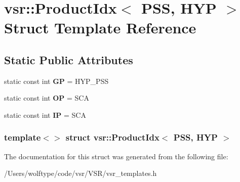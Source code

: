 \hypertarget{structvsr_1_1_product_idx_3_01_p_s_s_00_01_h_y_p_01_4}{\section{vsr\-:\-:Product\-Idx$<$ P\-S\-S, H\-Y\-P $>$ Struct Template Reference}
\label{structvsr_1_1_product_idx_3_01_p_s_s_00_01_h_y_p_01_4}
}
\subsection*{Static Public Attributes}
\begin{DoxyCompactItemize}
\item 
\hypertarget{structvsr_1_1_product_idx_3_01_p_s_s_00_01_h_y_p_01_4_ab7af9bced0e2bc59de0a6fbbaef07d05}{static const int {\bfseries G\-P} = H\-Y\-P\-\_\-\-P\-S\-S}\label{structvsr_1_1_product_idx_3_01_p_s_s_00_01_h_y_p_01_4_ab7af9bced0e2bc59de0a6fbbaef07d05}

\item 
\hypertarget{structvsr_1_1_product_idx_3_01_p_s_s_00_01_h_y_p_01_4_a5fa4f921578a53e3b93872497f43f5ae}{static const int {\bfseries O\-P} = S\-C\-A}\label{structvsr_1_1_product_idx_3_01_p_s_s_00_01_h_y_p_01_4_a5fa4f921578a53e3b93872497f43f5ae}

\item 
\hypertarget{structvsr_1_1_product_idx_3_01_p_s_s_00_01_h_y_p_01_4_a4153d4781b0a4cb52270d65b992a949b}{static const int {\bfseries I\-P} = S\-C\-A}\label{structvsr_1_1_product_idx_3_01_p_s_s_00_01_h_y_p_01_4_a4153d4781b0a4cb52270d65b992a949b}

\end{DoxyCompactItemize}
\subsubsection*{template$<$$>$ struct vsr\-::\-Product\-Idx$<$ P\-S\-S, H\-Y\-P $>$}



The documentation for this struct was generated from the following file\-:\begin{DoxyCompactItemize}
\item 
/\-Users/wolftype/code/vsr/\-V\-S\-R/vsr\-\_\-templates.\-h\end{DoxyCompactItemize}
